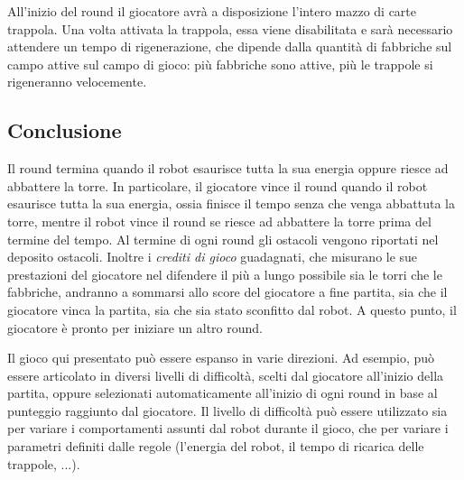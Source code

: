 All'inizio del round il giocatore avrà a disposizione l'intero mazzo di carte trappola. Una volta attivata la trappola, essa viene disabilitata e sarà necessario attendere un tempo di rigenerazione, che dipende dalla quantità di fabbriche sul campo attive sul campo di gioco: più fabbriche sono attive, più le trappole si rigeneranno velocemente.

	\subsection*{Conclusione} 
Il round termina quando il robot esaurisce tutta la sua energia oppure riesce ad abbattere la torre. In particolare, il giocatore vince il round quando il robot esaurisce tutta la sua energia, ossia finisce il tempo senza che venga abbattuta la torre, mentre il robot vince il round se riesce ad abbattere la torre prima del termine del tempo.
Al termine di ogni round gli ostacoli vengono riportati nel deposito ostacoli.
Inoltre i \emph{crediti di gioco} guadagnati, che misurano le sue prestazioni del giocatore nel difendere il più a lungo possibile sia le torri che le fabbriche, andranno a sommarsi allo score del giocatore a fine partita, sia che il giocatore vinca la partita, sia che sia stato sconfitto dal robot.
A questo punto, il giocatore è pronto per iniziare un altro round.

\begin{nota}
Il gioco qui presentato può essere espanso in varie direzioni. Ad esempio, può essere articolato in diversi livelli di difficoltà, scelti dal giocatore all'inizio della partita, oppure selezionati automaticamente all'inizio di ogni round in base al punteggio raggiunto dal giocatore. Il livello di difficoltà può essere utilizzato sia per variare i comportamenti assunti dal robot durante il gioco, che per variare i parametri definiti dalle regole (l'energia del robot, il tempo di ricarica delle trappole, ...).
\end{nota}

